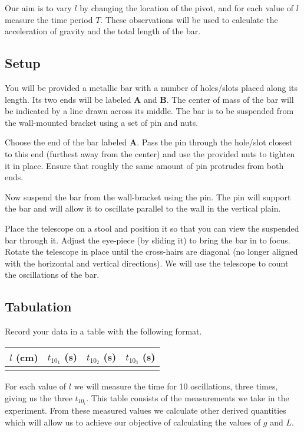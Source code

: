 \documentclass{article}
\begin{document}
      Our aim is to vary $l$ by changing the location of the pivot, and for each value of $l$ measure the time period $T$. These observations will be used to calculate the acceleration of gravity and the total length of the bar.

      \subsection*{Setup}

         You will be provided a metallic bar with a number of holes/slots placed along its length. Its two ends will be labeled \textbf{A} and \textbf{B}. The center of mass of the bar will be indicated by a line drawn across its middle. The bar is to be suspended from the wall-mounted bracket using a set of pin and nuts.

         Choose the end of the bar labeled \textbf{A}. Pass the pin through the hole/slot closest to this end (furthest away from the center) and use the provided nuts to tighten it in place. Ensure that roughly the same amount of pin protrudes from both ends.

         Now suspend the bar from the wall-bracket using the pin. The pin will support the bar and will allow it to oscillate parallel to the wall in the vertical plain.

         Place the telescope on a stool and position it so that you can view the suspended bar through it. Adjust the eye-piece (by sliding it) to bring the bar in to focus. Rotate the telescope in place until the cross-hairs are diagonal (no longer aligned with the horizontal and vertical directions). We will use the telescope to count the oscillations of the bar.

      \subsection*{Tabulation}

         Record your data in a table with the following format.

         \begin{table}[h]
            \centering

            \begin{tabular}{| c | c | c | c |}

               \hline
               $l$ (\si{\centi\metre}) & $t_{10_1}$ (\si{\second}) & $t_{10_2}$ (\si{\second}) & $t_{10_3}$ (\si{\second}) \\

               \hline
                  & & & \\
               \hline

            \end{tabular}
         \end{table}
         For each value of $l$ we will measure the time for 10 oscillations, three times, giving us the three $t_{10_i}$. This table consists of the measurements we take in the experiment. From these measured values we calculate other derived quantities which will allow us to achieve our objective of calculating the values of $g$ and $L$. 
\end{document}
